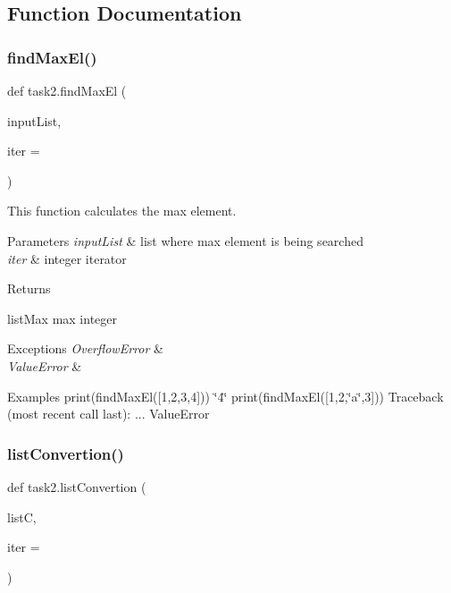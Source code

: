 \subsection{Function Documentation}
\mbox{\label{namespacetask2_ab1e91c5a3a92f52a8577e1992a218e0e}} 
\subsubsection{\texorpdfstring{find\+Max\+El()}{findMaxEl()}}
{\footnotesize\ttfamily def task2.\+find\+Max\+El (\begin{DoxyParamCaption}\item[{}]{input\+List,  }\item[{}]{iter = {} }\end{DoxyParamCaption})}



This function calculates the max element. 


\begin{DoxyParams}{Parameters}
{\em input\+List} & list where max element is being searched \\
\hline
{\em iter} & integer iterator \\
\hline
\end{DoxyParams}
\begin{DoxyReturn}{Returns}


list\+Max max integer
\end{DoxyReturn}

\begin{DoxyExceptions}{Exceptions}
{\em Overflow\+Error} & \\
\hline
{\em Value\+Error} & \\
\hline
\end{DoxyExceptions}
\begin{DoxyParagraph}{Examples}
print(find\+Max\+El(\mbox{[}1,2,3,4\mbox{]})) \char`\"{}4\char`\"{} print(find\+Max\+El(\mbox{[}1,2,\char`\"{}a\char`\"{},3\mbox{]})) Traceback (most recent call last)\+: ... Value\+Error 
\end{DoxyParagraph}
\mbox{\label{namespacetask2_af2d3e8cd162d9d507993819e98d611ee}} 
\subsubsection{\texorpdfstring{list\+Convertion()}{listConvertion()}}
{\footnotesize\ttfamily def task2.\+list\+Convertion (\begin{DoxyParamCaption}\item[{}]{listC,  }\item[{}]{iter = {} }\end{DoxyParamCaption})}



